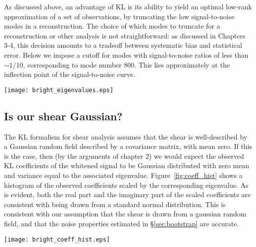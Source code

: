 As discussed above, an advantage of KL is its ability to yield an optimal
low-rank approximation of a set of observations, by truncating the low
signal-to-noise modes in a reconstruction.  The choice of which modes to
truncate for a reconstruction or other analysis is not straightforward:
as discussed in Chapters 3-4, this decision amounts to a tradeoff between
systematic bias and statistical error.  Below we impose a cutoff for
modes with signal-to-noise ratios of less than $\sim 1/10$, corresponding to
mode number 800.  This lies approximately at the inflection point of the
signal-to-noise curve.

\begin{figure*}
 \centering
 \texttt{[image: bright\_eigenvalues.eps]}
 \caption{
   The distribution of KL eigenvalues for the eigenmodes shown
   in Figure~\ref{fig:eigenmodes}.  There are $41 \times 40 = 1640$
   pixels, but approximately 90 of these contain no sources and are part of
   the mask.  This is reflected in the fact that the final 90 KL modes have
   zero eigenvalue.}
   \label{fig:eigenvalues}
\end{figure*}

\subsection{Is our shear Gaussian?}
The KL formalism for shear analysis assumes that the shear is well-described
by a Gaussian random field described by a covariance matrix, with mean
zero.  If this is the case, then (by the arguments of chapter 2) we would
expect the observed KL coefficients of the whitened signal to be Gaussian
distributed with zero mean and variance equal to the associated eigenvalue.
Figure~\ref{fig:coeff_hist} shows a histogram of the observed coefficients
scaled by the corresponding eigenvalue.  As is evident, both the real
part and the imaginary part of the scaled coefficients are consistent with
being drawn from a standard normal distribution.  This is consistent with
our assumption that the shear is drawn from a gaussian random field, and
that the noise properties estimated in \S\ref{sec:bootstrap} are accurate.

\begin{figure*}
 \centering
 \texttt{[image: bright\_coeff\_hist.eps]}
 \caption{
   The histogram of normalized coefficients $a_i / \sqrt{\lambda_i}$.
   If the shear is truly a gaussian random field, this distribution should
   be a gaussian with unit variance.
   \label{fig:coeff_hist}}
\end{figure*}

